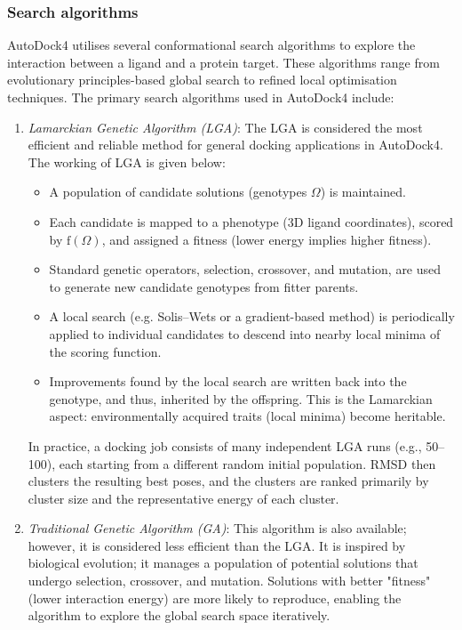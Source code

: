 \documentclass[12pt]{article}
\begin{document}
\subsubsection{Search algorithms}

AutoDock4 utilises several conformational search algorithms to explore the interaction between a ligand and a protein target\cite{CH7_Morris1998,CH7_Morris2009}. These algorithms range from evolutionary principles-based global search to refined local optimisation techniques.
The primary search algorithms used in AutoDock4 include:
\begin{enumerate}
\item \emph{Lamarckian Genetic Algorithm (LGA)}: 
The LGA is considered the most efficient and reliable method for general docking applications in AutoDock4.
The working of LGA is given below:
\begin{itemize}
  \item A population of candidate solutions (genotypes $\Omega$) is maintained.
  \item Each candidate is mapped to a phenotype (3D ligand coordinates), scored by $\textrm{f}(\Omega)$, and assigned a fitness (lower energy implies higher fitness).
  \item Standard genetic operators, selection, crossover, and mutation, are used to generate new candidate genotypes from fitter parents.
  \item A local search (e.g. Solis--Wets or a gradient-based method) is periodically applied to individual candidates to descend into nearby local minima of the scoring function\cite{CH7_Morris1998,CH7_SantosMartins2021}.
  \item Improvements found by the local search are written back into the genotype, and thus, inherited by the offspring. This is the Lamarckian aspect: environmentally acquired traits (local minima) become heritable.
\end{itemize}

In practice, a docking job consists of many independent LGA runs (e.g., 50--100), each starting from a different random initial population. RMSD then clusters the resulting best poses, and the clusters are ranked primarily by cluster size and the representative energy of each cluster\cite{CH7_Morris2009}.

\item \emph{Traditional Genetic Algorithm (GA)}: 
This algorithm is also available; however, it is considered less efficient than the LGA. It is inspired by biological evolution; it manages a population of potential solutions that undergo selection, crossover, and mutation. Solutions with better "fitness" (lower interaction energy) are more likely to reproduce, enabling the algorithm to explore the global search space iteratively.


\end{enumerate}
\end{document}
